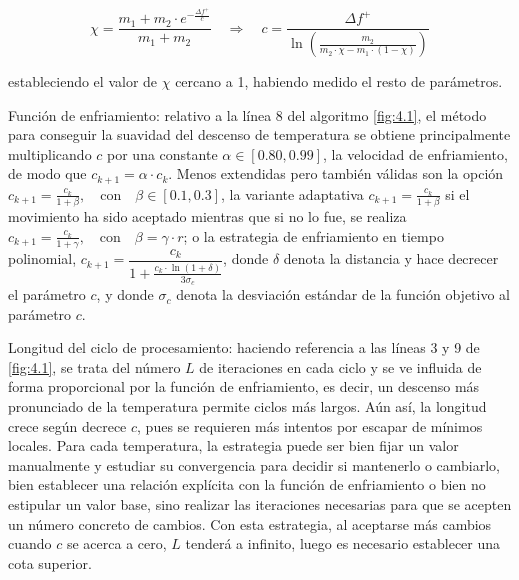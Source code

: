 \begin{displaymath}
    \chi = \dfrac{m_1 + m_2 \cdot e^{-\frac{\Delta f^{+}}{c}}}{m_1 + m_2} \quad \Longrightarrow \quad c = \dfrac{\Delta f^+}{\ln \left( \frac{m_2}{m_2 \cdot \chi - m_1 \cdot (1-\chi)} \right)}
\end{displaymath}

estableciendo el valor de $\chi$ cercano a 1, habiendo medido el resto de parámetros.

Función de enfriamiento: relativo a la línea 8 del algoritmo \ref{fig:4.1}, el método para conseguir la suavidad del descenso de temperatura se obtiene principalmente multiplicando $c$ por una constante $\alpha \in [0.80, 0.99]$, la velocidad de enfriamiento, de modo que $c_{k+1} = \alpha \cdot c_k$.
Menos extendidas pero también válidas son la opción $c_{k+1} =\frac{c_k}{1+\beta}, \quad \text{con} \quad \beta \in [0.1, 0.3]$, la variante adaptativa $c_{k+1} =\frac{c_k}{1+\beta}$ si el movimiento ha sido aceptado mientras que si no lo fue, se realiza $c_{k+1} =\frac{c_k}{1+\gamma}, \quad \text{con} \quad \beta = \gamma\cdot r$; o la estrategia de enfriamiento en tiempo polinomial, $c_{k+1} = \dfrac{c_k}{1 + \frac{c_k \cdot \ln(1 + \delta)}{3\sigma_c}}$, donde $\delta$ denota la distancia y hace decrecer el parámetro $c$, y donde $\sigma_c$ denota la desviación estándar de la función objetivo al parámetro $c$.

Longitud del ciclo de procesamiento: haciendo referencia a las líneas 3 y 9 de \ref{fig:4.1}, se trata del número $L$ de iteraciones en cada ciclo y se ve influida  de forma proporcional por la función de enfriamiento, es decir, un descenso más pronunciado de la temperatura permite ciclos más largos. Aún así, la longitud crece según decrece $c$, pues se requieren más intentos por escapar de mínimos locales. Para cada temperatura, la estrategia puede ser bien fijar un valor manualmente y estudiar su convergencia para decidir si mantenerlo o cambiarlo, bien establecer una relación explícita con la función de enfriamiento o bien no estipular un valor base, sino realizar las iteraciones necesarias para que se acepten un número concreto de cambios.
Con esta estrategia, al aceptarse más cambios cuando $c$ se acerca a cero, $L$ tenderá a infinito, luego es necesario establecer una cota superior.

